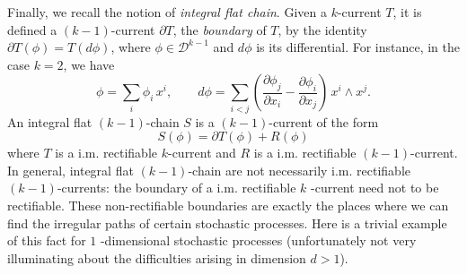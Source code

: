 \documentclass{article}
\begin{document}
Finally, we recall the notion of \textit{integral flat chain}. Given
a $k$-current $T$, it is defined a $(k-1)$-current $\partial T$, the
\emph{boundary} of $T$, by the identity $\partial T\left( \phi \right) =T\left(
d\phi \right) $, where $\phi \in \mathcal{D}^{k-1}$ and $d\phi $ is its
differential. For instance, in the case $k=2$, we have 
\begin{equation*}
\phi =\sum_{i}\phi _{i}\,x^{i},\qquad d\phi =\sum_{i<j}\left( \frac{\partial
\phi _{j}}{\partial x_{i}}-\frac{\partial \phi _{i}}{\partial x_{j}}\right)
\,x^{i}\wedge x^{j}.
\end{equation*}
An integral flat $(k-1)$-chain $S$ is a $(k-1)$-current of the form 
\begin{equation*}
S\left( \phi \right) =\partial T\left( \phi \right) +R\left( \phi \right)
\end{equation*}
where $T$ is a i.m. rectifiable $k$-current and $R$ is a i.m. rectifiable $%
(k-1)$-current. In general, integral flat $(k-1)$-chain are not necessarily
i.m. rectifiable $(k-1)$-currents: the boundary of a i.m. rectifiable $k$%
-current need not to be rectifiable. These non-rectifiable boundaries are
exactly the places where we can find the irregular paths of certain
stochastic processes. Here is a trivial example of this fact for $1$%
-dimensional stochastic processes (unfortunately not very illuminating about
the difficulties arising in dimension $d>1$).
\end{document}
